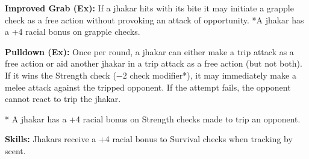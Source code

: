 \textbf{Improved Grab (Ex):} If a jhakar hits with its bite it may initiate a grapple check as a free action without provoking an attack of opportunity. *A jhakar has a +4 racial bonus on grapple checks.

\textbf{Pulldown (Ex):} Once per round, a jhakar can either make a trip attack as a free action or aid another jhakar in a trip attack as a free action (but not both). If it wins the Strength check ($-2$ check modifier*), it may immediately make a melee attack against the tripped opponent. If the attempt fails, the opponent cannot react to trip the jhakar.

* A jhakar has a +4 racial bonus on Strength checks made to trip an opponent.

\textbf{Skills:} Jhakars receive a +4 racial bonus to Survival checks when tracking by scent.

